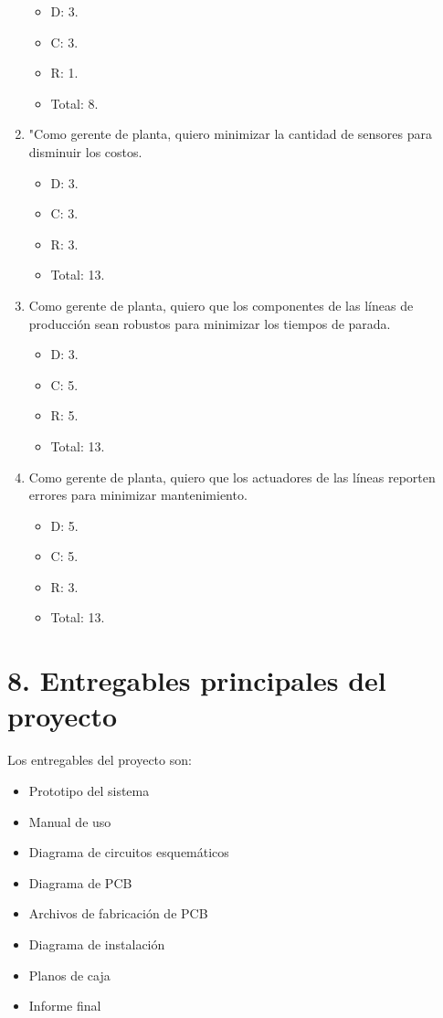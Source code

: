 \documentclass[
11pt, %
]{charter}
\begin{document}
\begin{enumerate}
\begin{itemize}
		\item D: 3.
		\item C: 3.
		\item R: 1.
		\item Total: 8.
	\end{itemize}
	\item "Como gerente de planta, quiero minimizar la cantidad de sensores para disminuir los costos.
	\begin{itemize}
		\item D: 3.
		\item C: 3.
		\item R: 3.
		\item Total: 13.
	\end{itemize}
	\item Como gerente de planta, quiero que los componentes de las líneas de producción sean robustos para minimizar los tiempos de parada.
	\begin{itemize}
		\item D: 3.
		\item C: 5.
		\item R: 5.
		\item Total: 13.
	\end{itemize}
	\item Como gerente de planta, quiero que los actuadores de las líneas reporten errores para minimizar mantenimiento.
	\begin{itemize}
		\item D: 5.
		\item C: 5.
		\item R: 3.
		\item Total: 13.
	\end{itemize}
\end{enumerate}

\section{8. Entregables principales del proyecto}
\label{sec:entregables}

Los entregables del proyecto son:

\begin{itemize}
	\item Prototipo del sistema
	\item Manual de uso
	\item Diagrama de circuitos esquemáticos
	\item Diagrama de PCB
	\item Archivos de fabricación de PCB
	\item Diagrama de instalación
	\item Planos de caja
	\item Informe final
\end{itemize}
\end{document}
